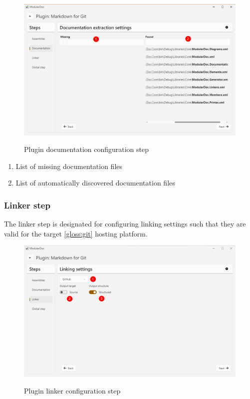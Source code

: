\begin{figure}[H]
    \includegraphics[width=\linewidth]{img/modularDocDocumentation.png}
    \label{fig:modularDocumentation}
    \caption{Plugin documentation configuration step}
\end{figure}

\begin{enumerate}
    \item List of missing documentation files
    \item List of automatically discovered documentation files
\end{enumerate}

\pagebreak
\subsubsection{Linker step}

The linker step is designated for configuring linking settings such that they are valid for the target \ref{gloss:git} hosting platform.

\begin{figure}[H]
    \includegraphics[width=\linewidth]{img/modularDocLinker.png}
    \label{fig:modularLinker}
    \caption{Plugin linker configuration step}
\end{figure}

